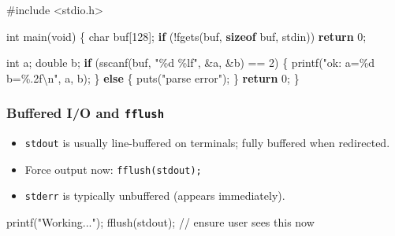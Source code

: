 \documentclass[
  letterpaper,
  DIV=11,
  numbers=noendperiod]{scrreprt}
\newenvironment{Shaded}{\begin{snugshade}}{\end{snugshade}}
\newcommand{\CommentTok}[1]{\textcolor[rgb]{0.37,0.37,0.37}{#1}}
\newcommand{\ControlFlowTok}[1]{\textcolor[rgb]{0.00,0.23,0.31}{\textbf{#1}}}
\newcommand{\DataTypeTok}[1]{\textcolor[rgb]{0.68,0.00,0.00}{#1}}
\newcommand{\DecValTok}[1]{\textcolor[rgb]{0.68,0.00,0.00}{#1}}
\newcommand{\ImportTok}[1]{\textcolor[rgb]{0.00,0.46,0.62}{#1}}
\newcommand{\KeywordTok}[1]{\textcolor[rgb]{0.00,0.23,0.31}{\textbf{#1}}}
\newcommand{\NormalTok}[1]{\textcolor[rgb]{0.00,0.23,0.31}{#1}}
\newcommand{\OperatorTok}[1]{\textcolor[rgb]{0.37,0.37,0.37}{#1}}
\newcommand{\PreprocessorTok}[1]{\textcolor[rgb]{0.68,0.00,0.00}{#1}}
\newcommand{\SpecialCharTok}[1]{\textcolor[rgb]{0.37,0.37,0.37}{#1}}
\newcommand{\StringTok}[1]{\textcolor[rgb]{0.13,0.47,0.30}{#1}}
\providecommand{\tightlist}{%
  \setlength{\itemsep}{0pt}\setlength{\parskip}{0pt}}
\begin{document}
\begin{Shaded}
\begin{Highlighting}[]
\PreprocessorTok{\#include }\ImportTok{\textless{}stdio.h\textgreater{}}

\DataTypeTok{int}\NormalTok{ main}\OperatorTok{(}\DataTypeTok{void}\OperatorTok{)} \OperatorTok{\{}
    \DataTypeTok{char}\NormalTok{ buf}\OperatorTok{[}\DecValTok{128}\OperatorTok{];}
    \ControlFlowTok{if} \OperatorTok{(!}\NormalTok{fgets}\OperatorTok{(}\NormalTok{buf}\OperatorTok{,} \KeywordTok{sizeof}\NormalTok{ buf}\OperatorTok{,}\NormalTok{ stdin}\OperatorTok{))} \ControlFlowTok{return} \DecValTok{0}\OperatorTok{;}

    \DataTypeTok{int}\NormalTok{ a}\OperatorTok{;} \DataTypeTok{double}\NormalTok{ b}\OperatorTok{;}
    \ControlFlowTok{if} \OperatorTok{(}\NormalTok{sscanf}\OperatorTok{(}\NormalTok{buf}\OperatorTok{,} \StringTok{"}\SpecialCharTok{\%d}\StringTok{ }\SpecialCharTok{\%lf}\StringTok{"}\OperatorTok{,} \OperatorTok{\&}\NormalTok{a}\OperatorTok{,} \OperatorTok{\&}\NormalTok{b}\OperatorTok{)} \OperatorTok{==} \DecValTok{2}\OperatorTok{)} \OperatorTok{\{}
\NormalTok{        printf}\OperatorTok{(}\StringTok{"ok: a=}\SpecialCharTok{\%d}\StringTok{ b=}\SpecialCharTok{\%.2f\textbackslash{}n}\StringTok{"}\OperatorTok{,}\NormalTok{ a}\OperatorTok{,}\NormalTok{ b}\OperatorTok{);}
    \OperatorTok{\}} \ControlFlowTok{else} \OperatorTok{\{}
\NormalTok{        puts}\OperatorTok{(}\StringTok{"parse error"}\OperatorTok{);}
    \OperatorTok{\}}
    \ControlFlowTok{return} \DecValTok{0}\OperatorTok{;}
\OperatorTok{\}}
\end{Highlighting}
\end{Shaded}

\subsubsection{\texorpdfstring{Buffered I/O and
\texttt{fflush}}{Buffered I/O and fflush}}\label{buffered-io-and-fflush}

\begin{itemize}
\tightlist
\item
  \texttt{stdout} is usually line-buffered on terminals; fully buffered
  when redirected.
\item
  Force output now: \texttt{fflush(stdout);}
\item
  \texttt{stderr} is typically unbuffered (appears immediately).
\end{itemize}

\begin{Shaded}
\begin{Highlighting}[]
\NormalTok{printf}\OperatorTok{(}\StringTok{"Working..."}\OperatorTok{);}\NormalTok{ fflush}\OperatorTok{(}\NormalTok{stdout}\OperatorTok{);} \CommentTok{// ensure user sees this now}
\end{Highlighting}
\end{Shaded}
\end{document}
